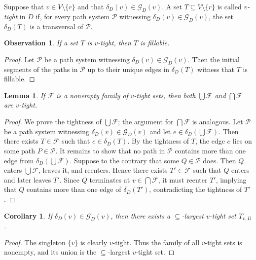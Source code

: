 \documentclass[12pt,a4paper]{amsart}
\theoremstyle{plain}
\newtheorem{corollary}[theorem]{Corollary}
\newtheorem{lemma}[theorem]{Lemma}
\newtheorem{observation}[theorem]{Observation}
\theoremstyle{definition}
\begin{document}
 Suppose that $v\in V\setminus\{r\}$ and that $\delta_D(v)\in\mathcal{G}_D(v)$.
 A set $T\subseteq V\setminus\{r\}$ is called \emph{$v$-tight} in $D$ if, for every path system $\mathcal{P}$ witnessing
 $\delta_D(v)\in\mathcal{G}_D(v)$, the set $\delta_D(T)$ is a transversal of $\mathcal{P}$.
 
 \begin{observation}\label{obs: tight is fillable}
 If a set $T$ is $v$-tight, then $T$ is fillable.
 \end{observation}
 
 \begin{proof}
 Let $\mathcal{P}$ be a path system witnessing $\delta_D(v)\in\mathcal{G}_D(v)$.
 Then the initial segments of the paths in $\mathcal{P}$ up to their unique edges in $\delta_D(T)$ witness that $T$ is fillable.
 \end{proof}
 
 \begin{lemma}\label{lem: tight union}
 If $\mathcal{F}$ is a nonempty family of $v$-tight sets, then both $\bigcup\mathcal{F}$ and $\bigcap\mathcal{F}$ are $v$-tight.
 \end{lemma}
 
 \begin{proof}
 We prove the tightness of $\bigcup\mathcal{F}$; the argument for $\bigcap\mathcal{F}$ is analogous.
 Let $\mathcal{P}$ be a path system witnessing $\delta_D(v)\in\mathcal{G}_D(v)$ and let $e\in\delta_D(\bigcup\mathcal{F})$.
 Then there exists $T\in\mathcal{F}$ such that $e\in\delta_D(T)$.
 By the tightness of $T$, the edge $e$ lies on some path $P\in\mathcal{P}$.
 It remains to show that no path in $\mathcal{P}$ contains more than one edge from $\delta_D(\bigcup\mathcal{F})$.
 Suppose to the contrary that some $Q\in\mathcal{P}$ does.
 Then $Q$ enters $\bigcup\mathcal{F}$, leaves it, and reenters.
 Hence there exists $T'\in\mathcal{F}$ such that $Q$ enters and later leaves $T'$.
 Since $Q$ terminates at $v\in\bigcap\mathcal{F}$, it must reenter $T'$,
 implying that $Q$ contains more than one edge of $\delta_D(T')$, contradicting the tightness of $T'$.
 \end{proof}
 
 \begin{corollary}\label{cor: largest tight}
 If $\delta_D(v)\in\mathcal{G}_D(v)$, then there exists a $\subseteq$-largest $v$-tight set $T_{v,D}$.
 \end{corollary}
 
 \begin{proof}
 The singleton $\{v\}$ is clearly $v$-tight.
 Thus the family of all $v$-tight sets is nonempty, and its union is the $\subseteq$-largest $v$-tight set.
 \end{proof}
\end{document}
